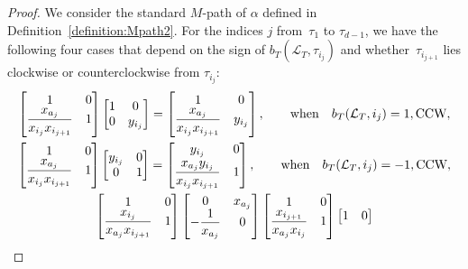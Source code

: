 \documentclass[10pt,a4paper]{amsart}
\numberwithin{equation}{section}
\theoremstyle{definition}
\begin{document}
\begin{proof}
We consider the standard $M$-path of $\alpha$ defined in Definition~\ref{definition:Mpath2}. For the indices $j$ from~$\tau_{1}$ to $\tau_{d-1}$, we have the following four cases that depend on the sign of $b_T(\mathcal{L}_T, \tau_{i_j})$ and whether~$\tau_{i_{j+1}}$ lies clockwise or counterclockwise from $\tau_{i_j}$:
\begin{gather}
 \begin{bmatrix}
 1 & 0\\
 \dfrac{x_{a_j}}{x_{i_j}x_{i_{j+1}}} & 1
 \end{bmatrix}
 \begin{bmatrix}
 1 & 0\\
 0 & y_{i_j}
 \end{bmatrix}=
 \begin{bmatrix}
 1 & 0\\
 \dfrac{x_{a_j}}{x_{i_j}x_{i_{j+1}}} & y_{i_j}
 \end{bmatrix},\qquad\text{when}\quad b_T(\mathcal{L}_T, i_j)=1, \text{CCW},\label{eqn:ccw+1}\\
 \begin{bmatrix}
 1 & 0\\
 \dfrac{x_{a_j}}{x_{i_j}x_{i_{j+1}}} & 1
 \end{bmatrix}
 \begin{bmatrix}
 y_{i_j} & 0\\
 0 & 1
 \end{bmatrix}=
 \begin{bmatrix}
 y_{i_j} & 0\vspace{1mm}\\
 \dfrac{x_{a_j}y_{i_j}}{x_{i_j}x_{i_{j+1}}} & 1
 \end{bmatrix} ,\qquad\text{when}\quad b_T(\mathcal{L}_T, i_j)=-1, \text{CCW},\label{eqn:ccw-1}\\
 \begin{bmatrix}
 1 & 0\\
 \dfrac{x_{i_j}}{x_{a_j}x_{i_{j+1}}} & 1\\
 \end{bmatrix}
 \begin{bmatrix}
 0 & x_{a_j}\\
 -\dfrac{1}{x_{a_j}} & 0
 \end{bmatrix}
 \begin{bmatrix}
 1 & 0\\
 \dfrac{x_{i_{j+1}}}{x_{a_j}x_{i_j}} & 1
 \end{bmatrix}
 \begin{bmatrix}
 1 & 0\\

\end{bmatrix}
\end{gather}
\end{proof}
\end{document}
